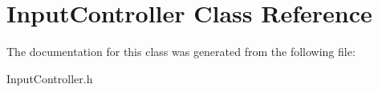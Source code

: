 \hypertarget{class_input_controller}{\section{Input\-Controller Class Reference}
\label{class_input_controller}
}


The documentation for this class was generated from the following file\-:\begin{DoxyCompactItemize}
\item 
Input\-Controller.\-h\end{DoxyCompactItemize}
